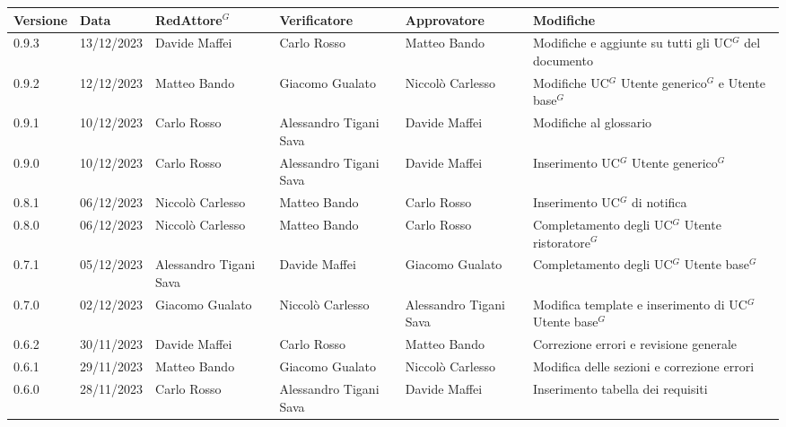 \begin{table}[H]
	\centering
	\fontsize{10}{12}\selectfont
	\begin{tabularx}{\textwidth}{X|X|X|X|X|X}
		\textbf{Versione}     & \textbf{Data}        & \textbf{Red\gls{Attore}$^G$}     &
		\textbf{Verificatore} & \textbf{Approvatore} & \textbf{Modifiche}                                                                                                    \\
		\toprule
		0.9.3                 & 13/12/2023           & Davide Maffei          & Carlo Rosso            & Matteo Bando       	& Modifiche e aggiunte su tutti gli \gls{UC}$^G$ del documento                                   \\
		\hline
		0.9.2                 & 12/12/2023           & Matteo Bando           & Giacomo Gualato        & Niccolò Carlesso       & Modifiche \gls{UC}$^G$ \gls{Utente generico}$^G$ e \gls{Utente base}$^G$                                     \\
		\hline
		0.9.1                 & 10/12/2023           & Carlo Rosso            & Alessandro Tigani Sava & Davide Maffei          & Modifiche al glossario                                     \\
		\hline
		0.9.0                 & 10/12/2023           & Carlo Rosso            & Alessandro Tigani Sava & Davide Maffei          & Inserimento \gls{UC}$^G$ \gls{Utente generico}$^G$                             \\
		\hline
		0.8.1                 & 06/12/2023           & Niccolò Carlesso       & Matteo Bando           & Carlo Rosso            & Inserimento \gls{UC}$^G$ di notifica                                 \\
		\hline
		0.8.0                 & 06/12/2023           & Niccolò Carlesso       & Matteo Bando           & Carlo Rosso            & Completamento degli \gls{UC}$^G$ \gls{Utente ristoratore}$^G$                  \\
		\hline
		0.7.1                 & 05/12/2023           & Alessandro Tigani Sava & Davide Maffei          & Giacomo Gualato        & Completamento degli \gls{UC}$^G$ \gls{Utente base}$^G$                         \\
		\hline
		0.7.0                 & 02/12/2023           & Giacomo Gualato        & Niccolò Carlesso       & Alessandro Tigani Sava & Modifica template e inserimento di \gls{UC}$^G$ \gls{Utente base}$^G$          \\
		\hline
		0.6.2                 & 30/11/2023           & Davide Maffei          & Carlo Rosso            & Matteo Bando           & Correzione errori e revisione generale                     \\
		\hline
		0.6.1                 & 29/11/2023           & Matteo Bando           & Giacomo Gualato        & Niccolò Carlesso       & Modifica delle sezioni e correzione errori                 \\
		\hline
		0.6.0                 & 28/11/2023           & Carlo Rosso            & Alessandro Tigani Sava & Davide Maffei          & Inserimento tabella dei requisiti                          \\
		\bottomrule
	\end{tabularx}
\end{table}



